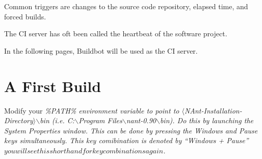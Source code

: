 Common triggers are changes to the source code repository, elapsed time, and forced builds.

The \gls{CI} server has oft been called the heartbeat of the software project.

In the following pages, \gls{Buildbot} will be used as the CI server.

\section{A First Build}


Modify your \em \%PATH\% \em environment variable to point to $\langle$NAnt-Installation-Directory$\rangle$$\backslash$bin (i.e. C:$\backslash$Program Files$\backslash$nant-0.90$\backslash$bin).
Do this by launching the System Properties window. This can be done by pressing the Windows and Pause keys simultaneously. This key comibination is
denoted by ``Windows + Pause'' \(you will see this shorthand for key combinations again\).

